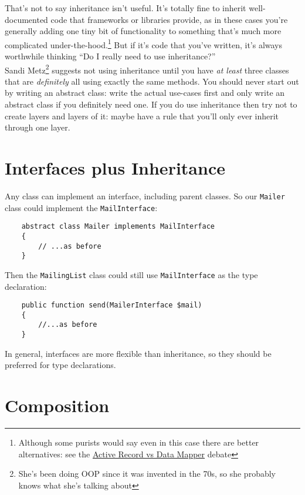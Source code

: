That's not to say inheritance isn't useful. It's totally fine to inherit well-documented code that frameworks or libraries provide, as in these cases you're generally adding one tiny bit of functionality to something that's much more complicated under-the-hood.\footnote{Although some purists would say even in this case there are better alternatives: see the \href{https://www.thoughtfulcode.com/orm-active-record-vs-data-mapper/}{Active Record vs Data Mapper} debate} But if it's code that you've written, it's always worthwhile thinking ``Do I really need to use inheritance?''
\\

Sandi Metz\footnote{She's been doing OOP since it was invented in the 70s, so she probably knows what she's talking about} suggests not using inheritance until you have \textit{at least} three classes that are \textit{definitely} all using exactly the same methods. You should never start out by writing an abstract class: write the actual use-cases first and only write an abstract class if you definitely need one. If you do use inheritance then try not to create layers and layers of it: maybe have a rule that you'll only ever inherit through one layer.

\section{Interfaces plus Inheritance}

Any class can implement an interface, including parent classes. So our \texttt{Mailer} class could implement the \texttt{MailInterface}:

\begin{verbatim}
    abstract class Mailer implements MailInterface
    {
        // ...as before
    }
\end{verbatim}

Then the \texttt{MailingList} class could still use \texttt{MailInterface} as the type declaration:

\begin{verbatim}
    public function send(MailerInterface $mail)
    {
        //...as before
    }
\end{verbatim}

In general, interfaces are more flexible than inheritance, so they should be preferred for type declarations.


\section{Composition}

